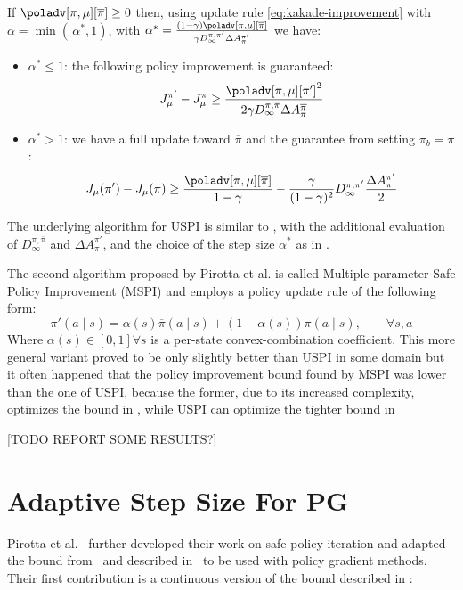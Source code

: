 \begin{theorem}
\label{th:pirotta-algo}
If $\poladv[\pi, \mu][\overline{\pi}] \geq 0$ then, using update rule \ref{eq:kakade-improvement} with $\alpha = \min(\, \alpha^*, 1)$, with $\alpha^* = \frac{(1-\gamma)\poladv[\pi, \mu][\overline{\pi}]}{\gamma D_\infty^{\pi, \pi'}\Delta A_\pi^{\pi'}}$ we have:
\begin{itemize}
\item $\alpha^* \leq 1$: the following policy improvement is guaranteed:
\[
J_\mu^{\pi'} - J_\mu^\pi \geq \frac{{\poladv[\pi, \mu][\pi']}^2}{2\gamma D_\infty^{\pi, \overline{\pi}}\Delta A_\pi^{\overline{\pi}}}
\]
\item $\alpha^* > 1$: we have a full update toward $\overline{\pi}$ and the guarantee from  setting $\pi_b = \pi$:
\begin{equation}
J_{\mu}(\pi') - J_\mu(\pi) \geq \frac{\poladv[\pi, \mu][\overline{\pi}]}{1-\gamma} - \frac{\gamma}{(1-\gamma)^2}{D_\infty^{\pi, \pi'}} \frac{\Delta A_{\pi}^{\pi'}}{2}
\end{equation}
\end{itemize}
\end{theorem}

The underlying algorithm for USPI is similar to , with the additional evaluation of $D_\infty^{\pi, \overline{\pi}}$ and $\Delta A_\pi^{\pi'}$, and the choice of the step size $\alpha^*$ as in .

The second algorithm proposed by Pirotta et al. is called Multiple-parameter Safe Policy Improvement (MSPI) and employs a policy update rule of the following form:
\[
\pi'(a\mid s) = \alpha(s)\overline{\pi}(a\mid s) + (1-\alpha(s))\pi(a\mid s),\qquad\forall s,a
\]
Where $\alpha(s)\in [0,1] \forall s$ is a per-state convex-combination coefficient. This more general variant proved to be only slightly better than USPI in some domain but it often happened that the policy improvement bound found by MSPI was lower than the one of USPI, because the former, due to its increased complexity, optimizes the bound in , while USPI can optimize the tighter bound in 

[TODO REPORT SOME RESULTS?]

\section{Adaptive Step Size For PG}
\label{sec:ass}
Pirotta et al.~\cite{adaptive_step} further developed their work on safe policy iteration and adapted the bound from~\cite{safe_iteration} and described in~ to be used with policy gradient methods.\\
Their first contribution is a continuous version of the bound described in :

